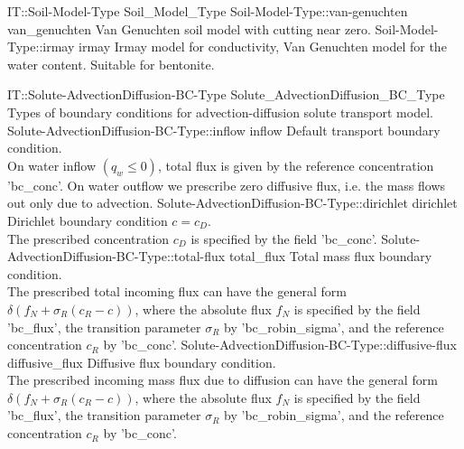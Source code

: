\begin{SelectionType}
	{IT::Soil-Model-Type}
	{Soil{\_}Model{\_}Type}
	{}
		\SelectionItem
			{Soil-Model-Type::van-genuchten}
			{van{\_}genuchten}
			{{{Van Genuchten soil model with cutting near zero.}}}
		\SelectionItem
			{Soil-Model-Type::irmay}
			{irmay}
			{{{Irmay model for conductivity, Van Genuchten model for the water content. Suitable for bentonite.}}}
\end{SelectionType}
\begin{SelectionType}
	{IT::Solute-AdvectionDiffusion-BC-Type}
	{Solute{\_}AdvectionDiffusion{\_}BC{\_}Type}
	{{{Types of boundary conditions for advection-diffusion solute transport model.}}}
		\SelectionItem
			{Solute-AdvectionDiffusion-BC-Type::inflow}
			{inflow}
			{{{Default transport boundary condition.}\\{
On water inflow }{$(q_w \le 0)$}{, total flux is given by the reference concentration 'bc{\_}conc'. On water outflow we prescribe zero diffusive flux, i.e. the mass flows out only due to advection.}}}
		\SelectionItem
			{Solute-AdvectionDiffusion-BC-Type::dirichlet}
			{dirichlet}
			{{{Dirichlet boundary condition }{$ c = c_D $}{.}\\{
The prescribed concentration }{$c_D$}{ is specified by the field 'bc{\_}conc'.}}}
		\SelectionItem
			{Solute-AdvectionDiffusion-BC-Type::total-flux}
			{total{\_}flux}
			{{{Total mass flux boundary condition.}\\{
The prescribed total incoming flux can have the general form }{$\delta(f_N+\sigma_R(c_R-c) )$}{, where the absolute flux }{$f_N$}{ is specified by the field 'bc{\_}flux', the transition parameter }{$\sigma_R$}{ by 'bc{\_}robin{\_}sigma', and the reference concentration }{$c_R$}{ by 'bc{\_}conc'.}}}
		\SelectionItem
			{Solute-AdvectionDiffusion-BC-Type::diffusive-flux}
			{diffusive{\_}flux}
			{{{Diffusive flux boundary condition.}\\{
The prescribed incoming mass flux due to diffusion can have the general form }{$\delta(f_N+\sigma_R(c_R-c) )$}{, where the absolute flux }{$f_N$}{ is specified by the field 'bc{\_}flux', the transition parameter }{$\sigma_R$}{ by 'bc{\_}robin{\_}sigma', and the reference concentration }{$c_R$}{ by 'bc{\_}conc'.}}}
\end{SelectionType}
